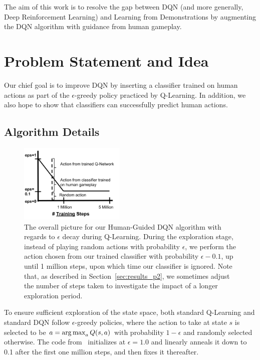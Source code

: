 \documentclass[letterpaper, 10pt, conference]{ieeeconf}
\begin{document}
The aim of this work is to resolve the gap between DQN (and more generally, Deep
Reinforcement Learning) and Learning from Demonstrations by augmenting the DQN
algorithm with guidance from human gameplay.



\section{Problem Statement and Idea}\label{sec:idea}

Our chief goal is to improve DQN by inserting a classifier trained on human
actions as part of the $\epsilon$-greedy policy practiced by Q-Learning. In
addition, we also hope to show that classifiers can successfully predict human
actions.

\subsection{Algorithm Details}\label{ssec:algorithm}

\begin{figure}[t]
\centering
\includegraphics[width=0.45\textwidth]{figures/dqn_with_human_data_graph.png}
\caption{\footnotesize
The overall picture for our Human-Guided DQN algorithm with regards to
$\epsilon$ decay during Q-Learning. During the exploration stage, instead of
playing random actions with probability $\epsilon$, we perform the action chosen
from our trained classifier with probability $\epsilon-0.1$, up until 1 million
steps, upon which time our classifier is ignored. Note that, as described in
Section~\ref{sec:results_p2}, we sometimes adjust the number of steps taken to
investigate the impact of a longer exploration period.
}
\label{fig:human-guided-dqn}
\end{figure}

To ensure sufficient exploration of the state space, both standard Q-Learning
and standard DQN follow $\epsilon$-greedy policies, where the action to take at
state $s$ is selected to be $a = \operatorname*{arg\,max}_a Q(s,a)$ with probability $1-\epsilon$
and randomly selected otherwise. The code from~\cite{mnih-dqn-2015} initializes
at $\epsilon=1.0$ and linearly anneals it down to 0.1 after the first one
million steps, and then fixes it thereafter.
\end{document}

